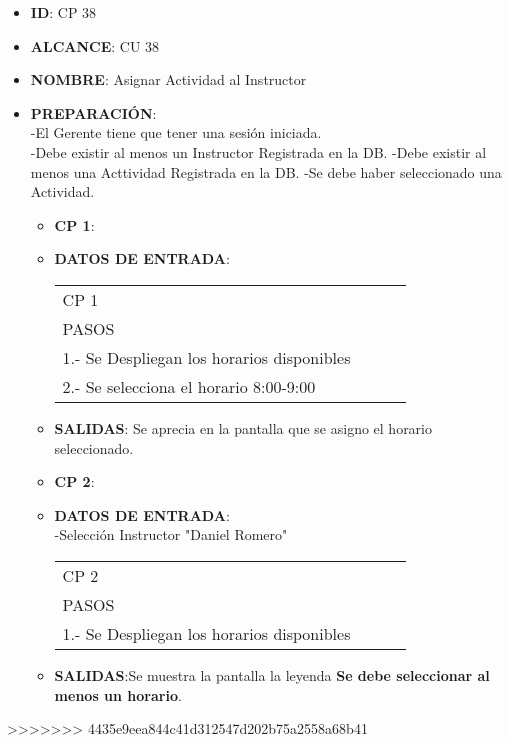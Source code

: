 \begin{itemize}
\item \textbf{ID}: CP 38
\item \textbf{ALCANCE}: CU 38
\item \textbf{NOMBRE}: Asignar Actividad al Instructor
\item \textbf{PREPARACIÓN}:\\
		-El Gerente tiene que tener una sesión iniciada.\\
		-Debe existir al menos un Instructor Registrada en la DB.
		-Debe existir al menos una Acttividad Registrada en la DB.
		-Se debe haber seleccionado una Actividad.
\begin{itemize}
\item \textbf{CP 1}:
\item \textbf{DATOS DE ENTRADA}:\\
	\begin{center}			
	\begin{tabular}{||l|l|l|l||}
		\hline
		\hline
			CP 1\\
			PASOS\\
			\hline 1.- Se Despliegan los horarios disponibles\\
			\hline 2.- Se selecciona el horario 8:00-9:00\\
        \hline
		\hline
	\end{tabular}
	\end{center}
\item \textbf{SALIDAS}: Se aprecia en la pantalla que se asigno el horario seleccionado.
\end{itemize}
\begin{itemize}
\item \textbf{CP 2}:
\item \textbf{DATOS DE ENTRADA}:\\
-Selección Instructor "Daniel Romero"
	\begin{center}			
	\begin{tabular}{||l|l|l|l||}
		\hline
		\hline
			CP 2\\
			PASOS\\
			\hline 1.- Se Despliegan los horarios disponibles\\
        \hline
		\hline
	\end{tabular}
	\end{center}
\item \textbf{SALIDAS}:Se muestra la pantalla  la leyenda \textbf{Se debe seleccionar al menos un horario}.
\end{itemize}
\end{itemize}

>>>>>>> 4435e9eea844c41d312547d202b75a2558a68b41
